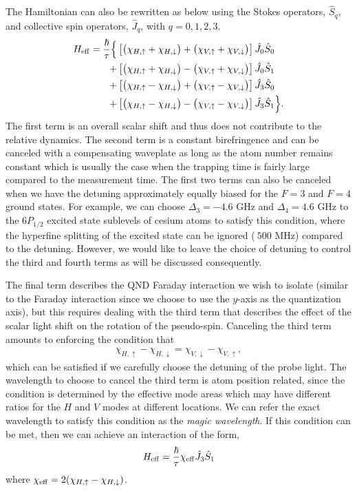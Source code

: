 \documentclass[preprint,aps,pra,onecolumn]{revtex4-1} %
\begin{document}
The Hamiltonian can also be rewritten as below using the Stokes operators, $ \hat{S}_q $, and collective spin operators, $ \hat{J}_q $, with $ q=0,1,2,3 $.
\begin{align}
H_{\rm eff} 
=\frac{\hbar}{\tau} \Big\{ & \left[ \big( \chi_{H,\uparrow} + \chi_{H,\downarrow}\big) + \big(\chi_{V,\uparrow} + \chi_{V,\downarrow}\big) \right] \hat{J}_0 \hat{S}_0 \nonumber \\
+ & \left[ \big( \chi_{H, \uparrow} + \chi_{H,\downarrow}\big) - \big( \chi_{V,\uparrow} + \chi_{V,\downarrow} \big)\right]  \hat{J}_0 \hat{S}_1 \nonumber \\
+ & \left[ \big( \chi_{H,\uparrow} - \chi_{H,\downarrow}\big) + \big(\chi_{V,\uparrow} - \chi_{V,\downarrow} \big) \right] \hat{J}_3 \hat{S}_0 \nonumber \\
+ & \left[ \big( \chi_{H,\uparrow} - \chi_{H,\downarrow}\big) - \big(\chi_{V,\uparrow} - \chi_{V,\downarrow} \big) \right]  \hat{J}_3 \hat{S}_1\Big\}.
\end{align}
The first term is an overall scalar shift and thus does not contribute to the relative dynamics.  The second term is a constant birefringence and can be canceled with a compensating waveplate as long as the atom number remains constant which is usually the case when the trapping time is fairly large compared to the measurement time. The first two terms can also be canceled when we have the detuning approximately equally biased for the $ F=3 $ and $ F=4 $ ground states. 
For example, we  can choose $ \Delta_3=-4.6 $ GHz and $ \Delta_4=4.6 $ GHz to the $ 6P_{1/2} $ excited state sublevels of cesium atoms to satisfy this condition, where the hyperfine splitting of the excited state can be ignored ($ ~500 $ MHz) compared to the detuning. However, we would like to leave the choice of detuning to control the third and fourth terms as will be discussed consequently. 

The final term describes the QND Faraday interaction we wish to isolate (similar to the Faraday interaction since we choose to use the $ y $-axis as the quantization axis), but this requires dealing with the third term that describes the effect of the scalar light shift on the rotation of the pseudo-spin.  Canceling the third term amounts to enforcing the condition that
\begin{align}
	\chi_{H,\uparrow} - \chi_{H,\downarrow} = \chi_{V,\downarrow} - \chi_{V,\uparrow} ,
\end{align}
which can be satisfied if we carefully choose the detuning of the probe light. The wavelength to choose to cancel the third term is atom position related, since the condition is determined by the effective mode areas which may have different ratios for the $ H $ and $ V $ modes at different locations. We can refer the exact wavelength to satisfy this condition as the \textit{magic wavelength}. If this condition can be met, then we can achieve an interaction of the form,
\begin{align}
	H_{\rm eff} = \frac{\hbar}{\tau} \chi_{\rm eff} \hat{J}_3 \hat{S}_1
\end{align}
where $\chi_{\rm eff} = 2(\chi_{H,\uparrow} - \chi_{H,\downarrow})$.  
\end{document}
